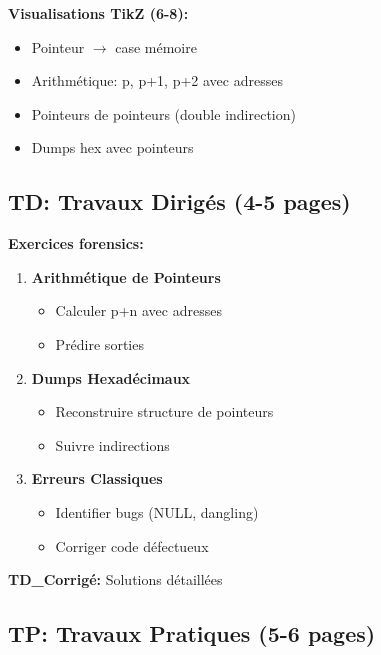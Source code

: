 \documentclass[10pt,a4paper]{article}
\begin{document}
\textbf{Visualisations TikZ (6-8):}
\begin{itemize}
\item Pointeur $\rightarrow$ case mémoire
\item Arithmétique: p, p+1, p+2 avec adresses
\item Pointeurs de pointeurs (double indirection)
\item Dumps hex avec pointeurs
\end{itemize}

\subsection*{TD: Travaux Dirigés (4-5 pages)}

\textbf{Exercices forensics:}
\begin{enumerate}
\item \textbf{Arithmétique de Pointeurs}
   \begin{itemize}
   \item Calculer p+n avec adresses
   \item Prédire sorties
   \end{itemize}

\item \textbf{Dumps Hexadécimaux}
   \begin{itemize}
   \item Reconstruire structure de pointeurs
   \item Suivre indirections
   \end{itemize}

\item \textbf{Erreurs Classiques}
   \begin{itemize}
   \item Identifier bugs (NULL, dangling)
   \item Corriger code défectueux
   \end{itemize}
\end{enumerate}

\textbf{TD\_Corrigé:} Solutions détaillées

\subsection*{TP: Travaux Pratiques (5-6 pages)}
\end{document}
